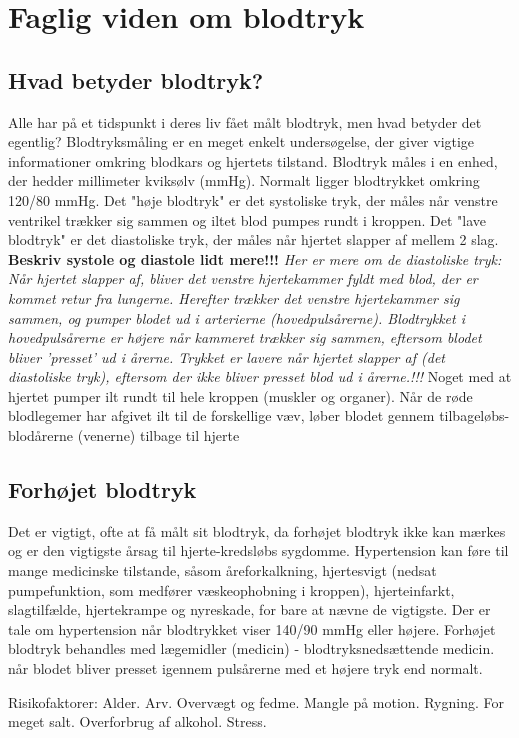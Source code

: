 \chapter{Faglig viden om blodtryk}
\section{Hvad betyder blodtryk?} 
Alle har på et tidspunkt i deres liv fået målt blodtryk, men hvad betyder det egentlig?
Blodtryksmåling er en meget enkelt undersøgelse, der giver vigtige informationer omkring blodkars og hjertets tilstand. 
Blodtryk måles i en enhed, der hedder millimeter kviksølv (mmHg). Normalt ligger blodtrykket omkring 120/80 mmHg. 
Det "høje blodtryk" er det systoliske tryk, der måles når venstre ventrikel trækker sig sammen og iltet blod pumpes rundt i kroppen.  
Det "lave blodtryk" er det diastoliske tryk, der måles når hjertet slapper af mellem 2 slag. 
\textbf{Beskriv systole og diastole lidt mere!!!} 
\textit{Her er mere om de diastoliske tryk: Når hjertet slapper af, bliver det venstre hjertekammer fyldt med blod, der er kommet retur fra lungerne. Herefter trækker det venstre hjertekammer sig sammen, og pumper blodet ud i arterierne (hovedpulsårerne). Blodtrykket i hovedpulsårerne er højere når kammeret trækker sig sammen, eftersom blodet bliver 'presset' ud i årerne. Trykket er lavere når hjertet slapper af (det diastoliske tryk), eftersom der ikke bliver presset blod ud i årerne.!!! }
Noget med at hjertet pumper ilt rundt til hele kroppen (muskler og organer). 
Når de røde blodlegemer har afgivet ilt til de forskellige væv, løber blodet gennem tilbageløbs-blodårerne (venerne) tilbage til hjerte
   

\section{Forhøjet blodtryk} 
Det er vigtigt, ofte at få målt sit blodtryk, da forhøjet blodtryk ikke kan mærkes og er den vigtigste årsag til hjerte-kredsløbs sygdomme. Hypertension kan føre til mange medicinske tilstande, såsom åreforkalkning, hjertesvigt (nedsat pumpefunktion, som medfører væskeophobning i kroppen), hjerteinfarkt, slagtilfælde, hjertekrampe og nyreskade, for bare at nævne de vigtigste. 
Der er tale om hypertension når blodtrykket viser 140/90 mmHg eller højere.  
Forhøjet blodtryk behandles med lægemidler (medicin) - blodtryksnedsættende medicin. 
når blodet bliver presset igennem pulsårerne med et højere tryk end normalt.

Risikofaktorer:
Alder. Arv. Overvægt og fedme. Mangle på motion. Rygning. For meget salt. Overforbrug af alkohol. Stress. 

